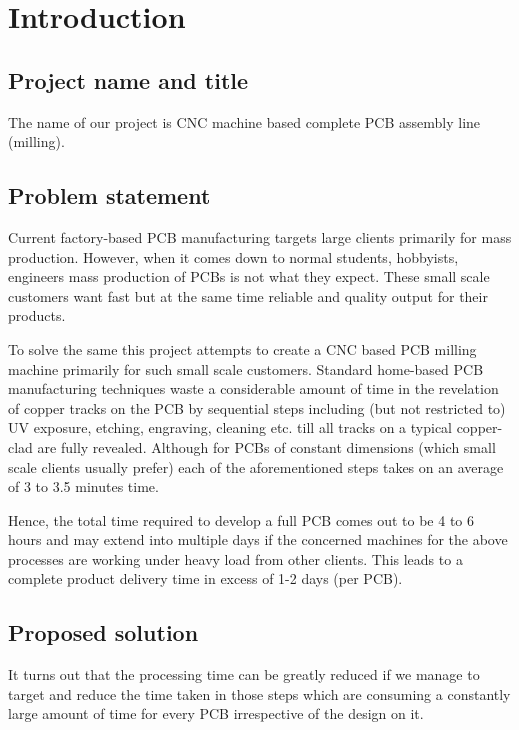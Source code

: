 \chapter{Introduction}
\thispagestyle{empty} %

\setcounter{page}{2} %

\section{Project name and title}
The name of our project is CNC machine based complete PCB assembly line (milling).

\section{Problem statement}
Current factory-based PCB manufacturing targets large clients primarily for mass production. However, when it comes down to normal students, hobbyists, engineers mass production of PCBs is not what they expect. These small scale customers want fast but at the same time reliable and quality output for their products. \par

To solve the same this project attempts to create a CNC based PCB milling machine primarily for such small scale customers. Standard home-based PCB manufacturing techniques waste a considerable amount of time in the revelation of copper tracks on the PCB by sequential steps including (but not restricted to) UV exposure, etching, engraving, cleaning etc. till all tracks on a typical copper-clad are fully revealed. Although for PCBs of constant dimensions (which small scale clients usually prefer) each of the aforementioned steps takes on an average of 3 to 3.5 minutes time. \par

Hence, the total time required to develop a full PCB comes out to be 4 to 6 hours and may extend into multiple days if the concerned machines for the above processes are working under heavy load from other clients. This leads to a complete product delivery time in excess of 1-2 days (per PCB). 


\section{Proposed solution}
It turns out that the processing time can be greatly reduced if we manage to target and reduce the time taken in those steps which are consuming a constantly large amount of time for every PCB irrespective of the design on it.  \par

